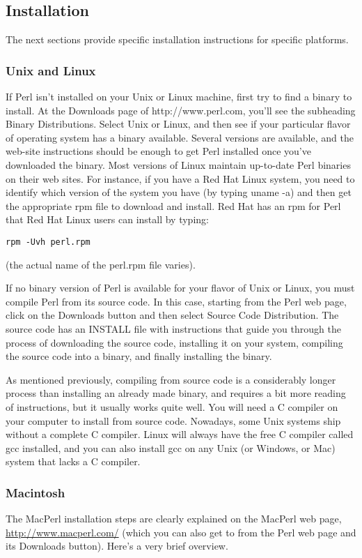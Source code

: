 \subsection{Installation}
The next sections provide specific installation instructions for specific platforms.

\subsubsection{Unix and Linux}
If Perl isn't installed on your Unix or Linux machine, first try to find a binary to install. At the Downloads page of http://www.perl.com, you'll see the subheading Binary Distributions. Select Unix or Linux, and then see if your particular flavor of operating system has a binary available. Several versions are available, and the web-site instructions should be enough to get Perl installed once you've downloaded the binary. Most versions of Linux maintain up-to-date Perl binaries on their web sites. For instance, if you have a Red Hat Linux system, you need to identify which version of the system you have (by typing uname -a) and then get the appropriate rpm file to download and install. Red Hat has an rpm for Perl that Red Hat Linux users can install by typing:

\verb|rpm -Uvh perl.rpm|

(the actual name of the perl.rpm file varies).

If no binary version of Perl is available for your flavor of Unix or Linux, you must compile Perl from its source code. In this case, starting from the Perl web page, click on the Downloads button and then select Source Code Distribution. The source code has an INSTALL file with instructions that guide you through the process of downloading the source code, installing it on your system, compiling the source code into a binary, and finally installing the binary.

As mentioned previously, compiling from source code is a considerably longer process than installing an already made binary, and requires a bit more reading of instructions, but it usually works quite well. You will need a C compiler on your computer to install from source code.  Nowadays, some Unix systems ship without a complete C compiler. Linux will always have the free C compiler called gcc installed, and you can also install gcc on any Unix (or Windows, or Mac) system that lacks a C compiler.

\subsubsection{Macintosh}
The MacPerl installation steps are clearly explained on the MacPerl web page, \href{http://www.macperl.com/}{http://www.macperl.com/} (which you can also get to from the Perl web page and its Downloads button). Here's a very brief overview.

